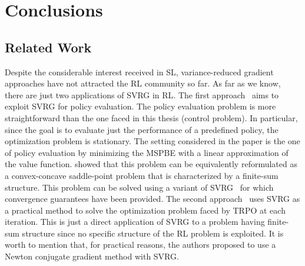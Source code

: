 \chapter{Conclusions} \label{chap:conclusions}
\section{Related Work}
\vspace{-0.05in}
Despite the considerable interest received in \acs{SL}, variance-reduced gradient approaches have not attracted the \acs{RL} community so far.
As far as we know, there are just two applications of \acs{SVRG} in \acs{RL}.
The first approach~\citep{du2017svrgpe} aims to exploit \acs{SVRG} for policy evaluation.
The policy evaluation problem is more straightforward than the one faced in this thesis (control problem).
In particular, since the goal is to evaluate just the performance of a predefined policy, the optimization problem is stationary.
The setting considered in the paper is the one of policy evaluation by minimizing the \ac{MSPBE} with a linear approximation of the value function. \citet{du2017svrgpe} showed that this problem can be equivalently reformulated as a convex-concave saddle-point problem that is characterized by a finite-sum structure.
This problem can be solved using a variant of \acs{SVRG}~\citep{Palaniappan2016svrgsaddle} for which convergence guarantees have been provided.
The second approach~\citep{xu2017svrgtrpo} uses \acs{SVRG} as a practical method to solve the optimization problem faced by \acs{TRPO} at each iteration. This is just a direct application of \acs{SVRG} to a problem having finite-sum structure since no specific structure of the \acs{RL} problem is exploited.
It is worth to mention that, for practical reasons, the authors proposed to use a Newton conjugate gradient method with \acs{SVRG}.

